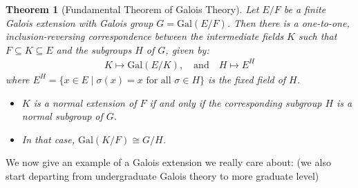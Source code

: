 \documentclass{article}
\newtheorem{theorem}{Theorem}[section]
\theoremstyle{definition}
\theoremstyle{definition}
\theoremstyle{definition}
\begin{document}
\begin{theorem}[Fundamental Theorem of Galois Theory]
Let $E/F$ be a finite Galois extension with Galois group $G = \mathrm{Gal}(E/F)$. Then there is a one-to-one, inclusion-reversing correspondence between the intermediate fields $K$ such that $F \subseteq K \subseteq E$ and the subgroups $H$ of $G$, given by:
\begin{align*}
    K \mapsto \mathrm{Gal}(E/K), \quad\text{and}\quad H \mapsto E^H
\end{align*}
where $E^H = \{ x \in E \mid \sigma(x) = x \text{ for all } \sigma \in H \}$ is the fixed field of $H$.

\begin{itemize}
    \item $K$ is a normal extension of $F$ if and only if the corresponding subgroup $H$ is a normal subgroup of $G$.
    \item In that case, $\mathrm{Gal}(K/F) \cong G/H$.
\end{itemize}
\end{theorem}

We now give an example of a Galois extension we really care about: (we also start departing from undergraduate Galois theory to more graduate level)
\end{document}
